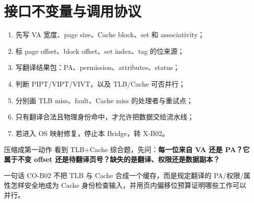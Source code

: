 \documentclass[UTF8,fontset=fandol,11pt,a4paper]{ctexart}
\newcommand{\kw}[1]{\textbf{\color{deep}#1}}
\begin{document}
\section{接口不变量与调用协议}
\begin{enumerate}
\item 先写 VA 宽度、page size、Cache block、set 和 associativity；
\item 标 page offset、block offset、set index、tag 的位来源；
\item 写翻译结果包：PA、permission、attributes、status；
\item 判断 PIPT/VIPT/VIVT，以及 TLB/Cache 可否并行；
\item 分别画 TLB miss、fault、Cache miss 的处理者与重试点；
\item 只有翻译合法且物理身份命中，才允许把数据交给流水线；
\item 若进入 OS 映射修复，停止本 Bridge，转 X-B02。
\end{enumerate}

\begin{methodbox}{压缩成第一动作}
看到 TLB+Cache 综合题，先问：\kw{每一位来自 VA 还是 PA？它属于不变 offset 还是待翻译页号？缺失的是翻译、权限还是数据副本？}
\end{methodbox}

\begin{corebox}{一句话}
CO-B02 不把 TLB 与 Cache 合成一个缓存，而是规定翻译的 PA/权限/属性怎样安全地成为 Cache 身份检查输入，并用页内偏移位预算证明哪些工作可以并行。
\end{corebox}
\end{document}
